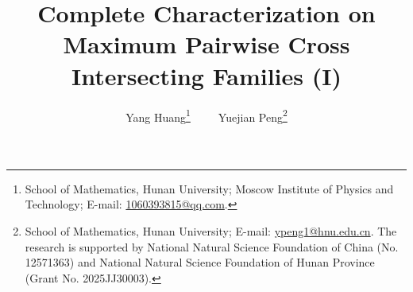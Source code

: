 \documentclass[a4paper,11pt]{article}
\begin{document}
\title{Complete Characterization on Maximum Pairwise Cross Intersecting Families (I)}
\author{
Yang Huang\thanks{School of Mathematics, Hunan University; Moscow Institute of Physics and Technology; 
E-mail: \url{1060393815@qq.com}.}
\,\,\,\,\,\,\,\,\,\,\,
Yuejian Peng\thanks{School of Mathematics, Hunan University; 
E-mail: \url{ypeng1@hnu.edu.cn}. 
The research is supported  by National Natural Science Foundation of China (No. 12571363) and National Natural Science Foundation of Hunan Province (Grant No. 2025JJ30003).}
}
\date{}





\maketitle

\vspace{-0.5cm}
\end{document}
